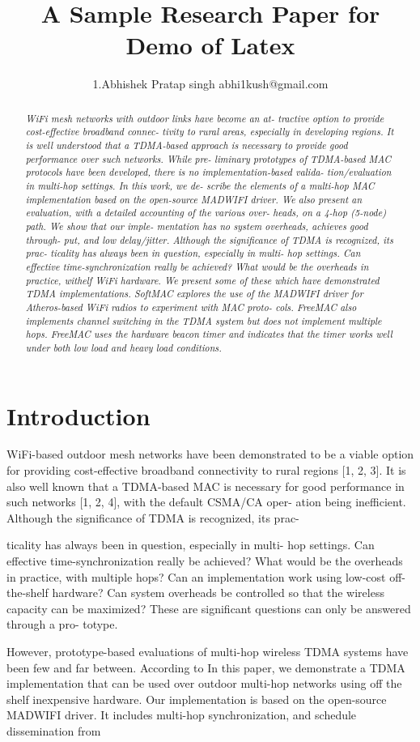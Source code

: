 \documentclass[a4paper,11pt,twocolumn,dvips]{report}
\title{{\bf A Sample Research Paper for Demo of Latex} }
\author{1.Abhishek Pratap singh
abhi1kush@gmail.com}
\begin{document}
\maketitle
\tableofcontents
\begin{abstract}
{ \it WiFi mesh networks with outdoor links have become an at-
tractive option to provide cost-effective broadband connec-
tivity to rural areas, especially in developing regions. It is
well understood that a TDMA-based approach is necessary
to provide good performance over such networks. While pre-
liminary prototypes of TDMA-based MAC protocols have
been developed, there is no implementation-based valida-
tion/evaluation in multi-hop settings. In this work, we de-
scribe the elements of a multi-hop MAC implementation
based on the open-source MADWIFI driver. We also present
an evaluation, with a detailed accounting of the various over-
heads, on a 4-hop (5-node) path. We show that our imple-
mentation has no system overheads, achieves good through-
put, and low delay/jitter. Although the significance of TDMA is recognized, its prac-
ticality has always been in question, especially in multi-
hop settings. Can effective time-synchronization really be
achieved? What would be the overheads in practice, withelf WiFi hardware. We present some of these which
have demonstrated TDMA implementations.
SoftMAC  explores the use of the MADWIFI driver for
Atheros-based WiFi radios to experiment with MAC proto-
cols. 
FreeMAC also implements channel switching in the TDMA
system but does not implement multiple hops. FreeMAC
uses the hardware beacon timer and indicates that the timer
works well under both low load and heavy load conditions.}
\end{abstract}

\section{Introduction}
\label{sec-intro}
WiFi-based outdoor mesh networks have been demonstrated
to be a viable option for providing cost-effective broadband
connectivity to rural regions [1, 2, 3]. It is also well known
that a TDMA-based MAC is necessary for good performance
in such networks [1, 2, 4], with the default CSMA/CA oper-
ation being inefficient.
Although the significance of TDMA is recognized, its prac-
\begin{multicols}{2}ticality has always been in question, especially in multi-
hop settings. Can effective time-synchronization really be
achieved? What would be the overheads in practice, with
multiple hops? Can an implementation work using low-cost
off-the-shelf hardware? Can system overheads be controlled
so that the wireless capacity can be maximized? These are
significant questions can only be answered through a pro-
totype.
\end{multicols}
However, prototype-based evaluations of multi-hop
wireless TDMA systems have been few and far between.
According to \cite{sampe1}
In this paper, we demonstrate a TDMA implementation
that can be used over outdoor multi-hop networks using
off the shelf inexpensive hardware. Our implementation
is based on the open-source MADWIFI driver. It includes
multi-hop synchronization, and schedule dissemination from
\end{document}
